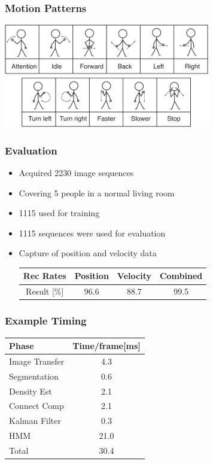 \documentclass[10pt]{beamer}
\begin{document}
\begin{frame}
  \frametitle{Motion Patterns}
  \begin{center}
    \includegraphics[width=9cm]{airport-gestures}
  \end{center}
\end{frame}

\begin{frame}
  \frametitle{Evaluation}
  \begin{itemize}
  \item Acquired 2230 image sequences
  \item Covering 5 people in a normal living room
  \item 1115 used for training
  \item 1115 sequences were used for evaluation
  \item Capture of position and velocity data
    \begin{tabular}[c]{|c|c|c|c|}
      \hline
      Rec Rates & Position & Velocity & Combined \\ \hline\hline
      Result [\%]& 96.6 & 88.7 & 99.5 \\ \hline
    \end{tabular}
  \end{itemize}
\end{frame}

\begin{frame}
  \frametitle{Example Timing}
  \begin{center}
    \begin{tabular}[c]{|l|c|} \hline
      Phase & Time/frame[ms]\\ \hline\hline
      Image Transfer & 4.3\\
      Segmentation & 0.6\\
      Density Est & 2.1\\
      Connect Comp & 2.1 \\
      Kalman Filter & 0.3 \\
      HMM & 21.0 \\ \hline
      Total & 30.4 \\\hline
    \end{tabular}
  \end{center}
\end{frame}
\end{document}
